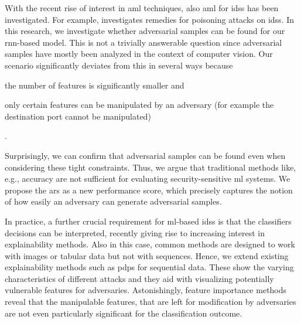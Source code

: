 \documentclass[conference]{IEEEtran}
\begin{document}
With the recent rise of interest in \gls{aml} techniques, also \gls{aml} for \glspl{ids} has been investigated. For example, \cite{bachl_walling_2019} investigates remedies for poisoning attacks on \glspl{ids}.
In this research, we investigate whether adversarial samples can be found for our \gls{rnn}-based model. This is not a trivially answerable question since adversarial samples have mostly been analyzed in the context of computer vision. Our scenario significantly deviates from this in several ways because \begin{enumerate*}
\item the number of features is significantly smaller and
\item only certain features can be manipulated by an adversary (for example the destination port cannot be manipulated)
\end{enumerate*}.

Surprisingly, we can confirm that adversarial samples can be found even when considering these tight constraints. %
Thus, we argue that traditional methods like, e.g., accuracy are not sufficient for evaluating security-sensitive \gls{ml} systems.
We propose the \acrfull{ars} as a new performance score, which precisely captures the notion of how easily an adversary can generate adversarial samples. 

In practice, a further crucial requirement for \gls{ml}-based \glspl{ids} 
is that the classifiers decisions can be interpreted, recently giving rise to increasing interest in explainability methods. Also in this case, common methods are designed to work with images or tabular data but not with sequences. Hence, we extend existing explainability methods such as \glspl{pdp} \cite{friedman_greedy_2001} for sequential data. These show the varying characteristics of different attacks and they aid with visualizing potentially vulnerable features for adversaries.
Astonishingly, feature importance methods reveal that the manipulable features, that are left for modification by adversaries are not even particularly significant for the classification outcome. %

\end{document}

